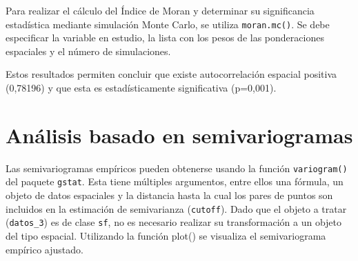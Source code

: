 \documentclass[11pt,b5paper,]{krantz}
\newenvironment{Shaded}{}{}
\newcommand{\CommentTok}[1]{\textcolor[rgb]{0.38,0.63,0.69}{\textit{#1}}}
\newcommand{\DataTypeTok}[1]{\textcolor[rgb]{0.56,0.13,0.00}{#1}}
\newcommand{\DecValTok}[1]{\textcolor[rgb]{0.25,0.63,0.44}{#1}}
\newcommand{\KeywordTok}[1]{\textcolor[rgb]{0.00,0.44,0.13}{\textbf{#1}}}
\newcommand{\NormalTok}[1]{#1}
\newcommand{\OperatorTok}[1]{\textcolor[rgb]{0.40,0.40,0.40}{#1}}
\newcommand{\OtherTok}[1]{\textcolor[rgb]{0.00,0.44,0.13}{#1}}
\newcommand{\StringTok}[1]{\textcolor[rgb]{0.25,0.44,0.63}{#1}}
\begin{document}
\begin{Shaded}
\end{Shaded}

Para realizar el cálculo del Índice de Moran y determinar su significancia estadística mediante simulación Monte Carlo, se utiliza \texttt{moran.mc()}. Se debe especificar la variable en estudio, la lista con los pesos de las ponderaciones espaciales y el número de simulaciones.

\begin{Shaded}
\end{Shaded}

Estos resultados permiten concluir que existe autocorrelación espacial positiva (0,78196) y que esta es estadísticamente significativa (p=0,001).

\hypertarget{anuxe1lisis-basado-en-semivariogramas}{%
\section{Análisis basado en semivariogramas}\label{anuxe1lisis-basado-en-semivariogramas}}

Las semivariogramas empíricos pueden obtenerse usando la función \texttt{variogram()} del paquete \texttt{gstat}. Esta tiene múltiples argumentos, entre ellos una fórmula, un objeto de datos espaciales y la distancia hasta la cual los pares de puntos son incluidos en la estimación de semivarianza (\texttt{cutoff}). Dado que el objeto a tratar (\texttt{datos\_3}) es de clase \texttt{sf}, no es necesario realizar su transformación a un objeto del tipo espacial. Utilizando la función plot() se visualiza el semivariograma empírico ajustado.
\end{document}
